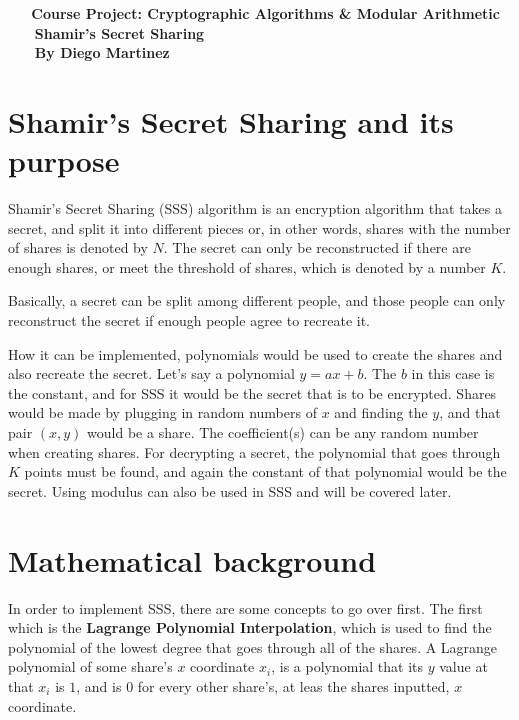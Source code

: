 \documentclass[15pt]{article}
\begin{document}
\begin{flushleft}

\begin{center}
    \bfseries\LARGE Course Project: Cryptographic Algorithms \& 
 Modular Arithmetic \\
    \bfseries\Large Shamir’s Secret Sharing \\
    \bfseries\large By Diego Martinez
\end{center}

\setlength{\parindent}{0.5in}

\section{\textbf{Shamir's Secret Sharing and its purpose}}
Shamir's Secret Sharing (SSS) algorithm is an encryption algorithm that takes a
secret, and split it into different pieces or, in other words, shares with the
number of shares is denoted by $N$. The secret can only be reconstructed if 
there are enough shares, or meet the threshold of shares, which is denoted by a
number $K$.

Basically, a secret can be split among different people, and those people can
only reconstruct the secret if enough people agree to recreate it.

How it can be implemented, polynomials would be used to create the shares and
also recreate the secret. Let's say a polynomial $y = ax + b$. The $b$ in this
case is the constant, and for SSS it would be the secret that is to be
encrypted. Shares would be made by plugging in random numbers of $x$ and finding
the $y$, and that pair $(x,y)$ would be a share. The coefficient(s) can be any
random number when creating shares. For decrypting a secret, the polynomial that
goes through $K$ points must be found, and again the constant of that polynomial
would be the secret. Using modulus can also be used in SSS and will be
covered later.

\section{\textbf{Mathematical background}}
In order to implement SSS, there are some concepts to go over first. The first
which is the \textbf{Lagrange Polynomial Interpolation}, which is used to find
the polynomial of the lowest degree that goes through all of the shares. A
Lagrange polynomial of some share's $x$ coordinate $x_i$, is a polynomial that
its $y$ value at that $x_i$ is $1$, and is $0$ for every other share's, at leas
the shares inputted, $x$ coordinate.


\end{flushleft}
\end{document}
